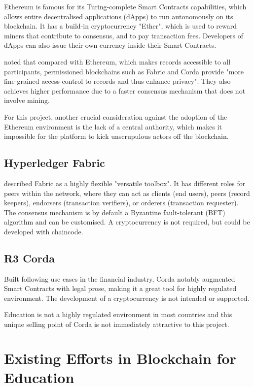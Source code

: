 Ethereum is famous for its Turing-complete Smart Contracts capabilities, which allows entire 
decentralised applications (dApps) to run autonomously on its blockchain. It has a build-in cryptocurrency 
"Ether", which is used to reward miners that contribute to consensus, and to pay transaction fees. 
Developers of dApps can also issue their own currency inside their Smart Contracts.

\citet[p.3-4]{valenta2017comparison} noted that compared with Ethereum, which makes records accessible 
to all participants, permissioned blockchains such as Fabric and Corda provide "more fine-grained access 
control to records and thus enhance privacy". 
They also achieves higher performance due to a faster consensus mechanism that does not involve mining.

For this project, another crucial consideration against the adoption of the Ethereum environment is the 
lack of a central authority, which makes it impossible for the platform to kick unscrupulous actors off 
the blockchain.

\subsection*{Hyperledger Fabric}

\citet[p.7]{valenta2017comparison} described Fabric as a highly flexible "versatile toolbox". It 
has different roles for peers within the network, where they can act as clients (end users), peers 
(record keepers), endorsers (transaction verifiers), or orderers (transaction requester). The 
consensus mechanism is by default a Byzantine fault-tolerant (BFT) algorithm and can be customised. 
A cryptocurrency is not required, but could be developed with chaincode.

\subsection*{R3 Corda}

Built following use cases in the financial industry, Corda notably augmented Smart Contracts 
with legal prose, making it a great tool for highly regulated environment. The development of 
a cryptocurrency is not intended or supported. \citep{valenta2017comparison}

Education is not a highly regulated environment in most countries and this unique selling point of 
Corda is not immediately attractive to this project.

\section{Existing Efforts in Blockchain for Education}

